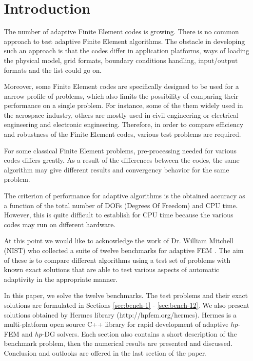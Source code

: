 \documentclass[12pt]{elsarticle}
\begin{document}

\section{Introduction}
\label{sec:intro}

The number of adaptive Finite Element codes is growing.
There is no common approach to test adaptive
Finite Element algorithms. The obstacle in developing such an approach is that
the codes differ in application platforms, ways of loading the physical model,
grid formats, boundary conditions handling, input/output formats and the list could go on.

Moreover, some Finite Element codes are specifically designed to be used for
a narrow profile of problems, which also limits the possibility of comparing
their performance on a single problem.
For instance, some of the them widely used in the aerospace industry, others are
mostly used in civil engineering or electrical engineering and electronic engineering.
Therefore, in order to compare efficiency and robustness of the Finite Element
codes, various test problems are required.

For some classical Finite Element problems, pre-processing
needed for various codes differs greatly.
As a result of the differences between the codes,
the same algorithm may give different results and convergency
behavior for the same problem.

The criterion of performance for adaptive algorithms
is the obtained accuracy as a function of the total number
of DOFs (Degrees Of Freedom) and CPU time. However,
this is quite difficult to establish for CPU time because
the various codes may run on different hardware.

At this point we would like to acknowledge the work of
Dr. William Mitchell (NIST) who collected a suite of
twelve benchmarks for adaptive FEM \cite{mitchell-1}.
The aim of these is to compare different algorithms
using a test set of problems with known exact solutions
that are able to test various aspects of automatic
adaptivity in the appropriate manner.

In this paper, we solve the twelve benchmarks.
The test problems and their exact solutions are
formulated in Sections \ref{sec:bench-1} - \ref{sec:bench-12}.
We also present solutions obtained by {\sc Hermes} library (http://hpfem.org/hermes).
{\sc Hermes} is a multi-platform open source C++
library for rapid development of adaptive $hp$-FEM
and $hp$-DG solvers. Each section also contains a short
description of the benchmark problem, then the numerical
results are presented and discussed. Conclusion and outlooks
are offered in the last section of the paper.
\end{document}
